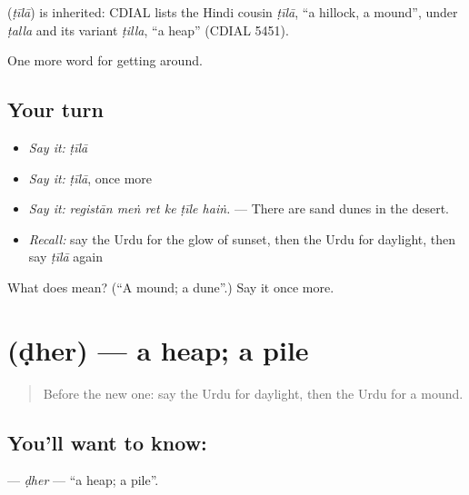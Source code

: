 \begin{cousinweb}
\textbf{} (\emph{ṭīlā}) is inherited: CDIAL lists the Hindi cousin \emph{ṭīlā}, \textquotedblleft{}a hillock, a mound\textquotedblright{}, under \emph{ṭalla} and its variant \emph{ṭilla}, \textquotedblleft{}a heap\textquotedblright{} (CDIAL 5451).
\end{cousinweb}

\begin{grammarlens}[title={What you've built}]
One more word for getting around.
\end{grammarlens}

\subsection*{Your turn}
\begin{itemize}
\raggedright
  \item \emph{Say it:} \emph{ṭīlā}
  \item \emph{Say it:} \emph{ṭīlā}, once more
  \item \emph{Say it:} \emph{registān meṅ ret ke ṭīle haiṅ.} — There are sand dunes in the desert.
  \item \emph{Recall:} say the Urdu for the glow of sunset, then the Urdu for daylight, then say \emph{ṭīlā} again
\end{itemize}

\begin{tcolorbox}[breakable,colback=teal!4,colframe=teal!35!black,title={Before you move on}]
What does  mean? (\textquotedblleft{}A mound; a dune\textquotedblright{}.) Say it once more.
\end{tcolorbox}
\section[\texorpdfstring{\ur{ڈھیر} (ḍher)}{ڈھیر (ḍher)}]{ (ḍher) — a heap; a pile}

\label{lesson:UR-C433-dher}



\begin{quote}
Before the new one: say the Urdu for daylight, then the Urdu for a mound.
\end{quote}

\subsection*{You'll want to know: }
\textbf{} — \emph{ḍher} — \textquotedblleft{}a heap; a pile\textquotedblright{}.

